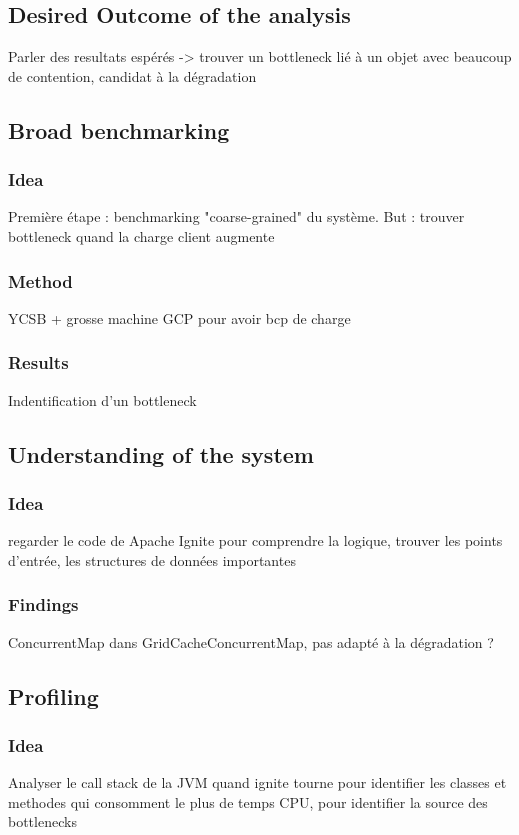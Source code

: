 \documentclass[conference]{IEEEtran}
\begin{document}
\subsection{Desired Outcome of the analysis}
Parler des resultats espérés -> trouver un bottleneck lié à un objet avec beaucoup de contention, candidat à la dégradation

\subsection{Broad benchmarking}
\subsubsection{Idea}
Première étape : benchmarking "coarse-grained" du système.
But : trouver bottleneck quand la charge client augmente 
\subsubsection{Method}
YCSB + grosse machine GCP pour avoir bcp de charge
\subsubsection{Results}
Indentification d'un bottleneck

\subsection{Understanding of the system}
\subsubsection{Idea}
regarder le code de Apache Ignite pour comprendre la logique, trouver les points d'entrée, les structures de données importantes
\subsubsection{Findings}
ConcurrentMap dans GridCacheConcurrentMap, pas adapté à la dégradation ?

\subsection{Profiling}
\subsubsection{Idea}
Analyser le call stack de la JVM quand ignite tourne pour identifier les classes et methodes qui consomment le plus de temps CPU, pour identifier la source des bottlenecks
\end{document}

